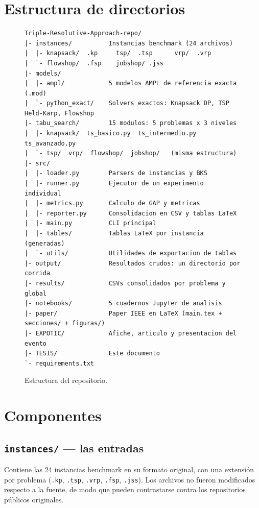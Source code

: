 \section{Estructura de directorios}

\begin{figure}[H]
\footnotesize
\begin{verbatim}
Triple-Resolutive-Approach-repo/
|- instances/          Instancias benchmark (24 archivos)
|  |- knapsack/  .kp     tsp/  .tsp      vrp/  .vrp
|  `- flowshop/  .fsp    jobshop/ .jss
|- models/
|  |- ampl/            5 modelos AMPL de referencia exacta (.mod)
|  `- python_exact/    Solvers exactos: Knapsack DP, TSP Held-Karp, Flowshop
|- tabu_search/        15 modulos: 5 problemas x 3 niveles
|  |- knapsack/  ts_basico.py  ts_intermedio.py  ts_avanzado.py
|  `- tsp/  vrp/  flowshop/  jobshop/   (misma estructura)
|- src/
|  |- loader.py        Parsers de instancias y BKS
|  |- runner.py        Ejecutor de un experimento individual
|  |- metrics.py       Calculo de GAP y metricas
|  |- reporter.py      Consolidacion en CSV y tablas LaTeX
|  |- main.py          CLI principal
|  |- tables/          Tablas LaTeX por instancia (generadas)
|  `- utils/           Utilidades de exportacion de tablas
|- output/             Resultados crudos: un directorio por corrida
|- results/            CSVs consolidados por problema y global
|- notebooks/          5 cuadernos Jupyter de analisis
|- paper/              Paper IEEE en LaTeX (main.tex + secciones/ + figuras/)
|- EXPOTIC/            Afiche, articulo y presentacion del evento
|- TESIS/              Este documento
`- requirements.txt
\end{verbatim}
\caption{Estructura del repositorio.}
\label{fig:estructura_repo}
\end{figure}

\section{Componentes}

\subsection{\texttt{instances/} --- las entradas}

Contiene las 24 instancias benchmark en su formato original, con una
extensión por problema (\texttt{.kp}, \texttt{.tsp}, \texttt{.vrp},
\texttt{.fsp}, \texttt{.jss}). Los archivos no fueron modificados respecto a
la fuente, de modo que pueden contrastarse contra los repositorios públicos
originales.

